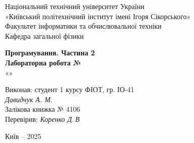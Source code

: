 \documentclass[12pt,a4paper]{article}
\begin{document}
    \begin{titlepage}

        \thispagestyle{empty}
        \begin{center}
        \large
        Національний технічний університет України\\
        «Київський політехнічний інститут імені Ігоря Сікорського»\\[1em]
        Факультет інформатики та обчислювальної техніки\\
        Кафедра загальної фізики
        \end{center}

        \vfill

        \begin{center}
        \textbf{\LARGE Програмування. Частина 2}\\[2em]
        \textbf{\Large Лабораторна робота №}\\
        «» 
        \end{center}

        \vfill

        \begin{flushright}
        Виконав: студент 1 курсу ФІОТ, гр. ІО-41\\
        \textit{Давидчук А. М.}\\
        Залікова книжка № 4106\\[1em]
        Перевірив: \textit{Коренко Д.\,В}
        \end{flushright}

        \vfill

        \begin{center}
        Київ -- 2025
        \end{center}

    \end{titlepage}

\end{document}
